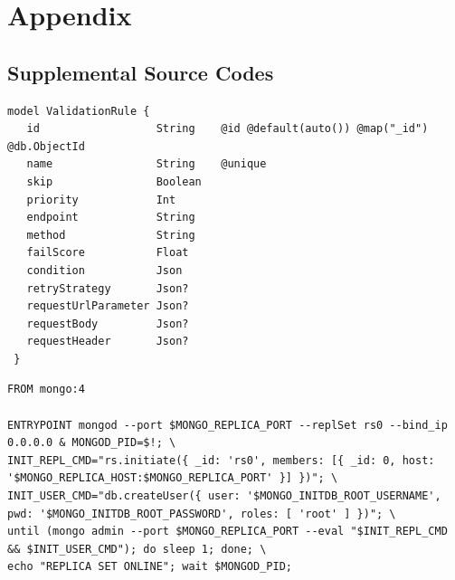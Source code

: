 \appendix
{}

\chapter{Appendix}

 \section{Supplemental Source Codes}
 
  \begin{lstlisting}[caption={\emph{Prisma} schema of a validation rule (Prisma)}, label={code:prisma}]
 model ValidationRule {
   id                  String    @id @default(auto()) @map("_id") @db.ObjectId
   name                String    @unique
   skip                Boolean
   priority            Int
   endpoint            String
   method              String
   failScore           Float
   condition           Json
   retryStrategy       Json?
   requestUrlParameter Json?
   requestBody         Json?
   requestHeader       Json?
 }
  \end{lstlisting}

  \begin{lstlisting}[caption={Dockerfile to run MongoDB as a replication set locally. Taken from Prisma GitHub repository (Docker)}, label={code:mongo}, language=docker]
FROM mongo:4

ENTRYPOINT mongod --port $MONGO_REPLICA_PORT --replSet rs0 --bind_ip 0.0.0.0 & MONGOD_PID=$!; \
INIT_REPL_CMD="rs.initiate({ _id: 'rs0', members: [{ _id: 0, host: '$MONGO_REPLICA_HOST:$MONGO_REPLICA_PORT' }] })"; \
INIT_USER_CMD="db.createUser({ user: '$MONGO_INITDB_ROOT_USERNAME', pwd: '$MONGO_INITDB_ROOT_PASSWORD', roles: [ 'root' ] })"; \
until (mongo admin --port $MONGO_REPLICA_PORT --eval "$INIT_REPL_CMD && $INIT_USER_CMD"); do sleep 1; done; \
echo "REPLICA SET ONLINE"; wait $MONGOD_PID;
  \end{lstlisting}
  
